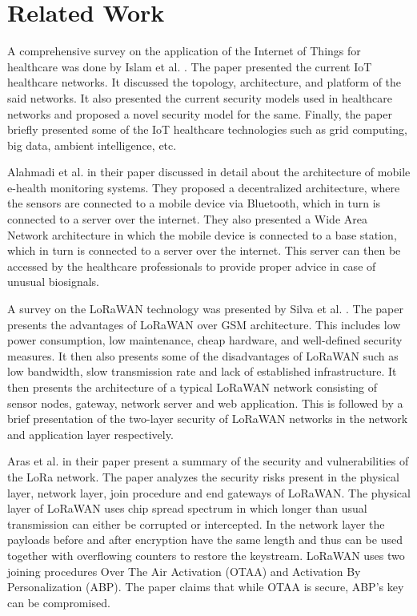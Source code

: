 \chapter{Related Work}
\label{cha:related-work}


A comprehensive survey on the application of the Internet of Things for healthcare was done by Islam et al. \cite{islam2015internet}. The paper presented the current IoT healthcare networks. It discussed the topology, architecture, and platform of the said networks. It also presented the current security models used in healthcare networks and proposed a novel security model for the same. Finally, the paper briefly presented some of the IoT healthcare technologies such as grid computing, big data, ambient intelligence, etc.

Alahmadi et al. \cite{alahmadi2011smart} in their paper discussed in detail about the architecture of mobile e-health monitoring systems. They proposed a decentralized architecture, where the sensors are connected to a mobile device via Bluetooth, which in turn is connected to a server over the internet. They also presented a Wide Area Network architecture in which the mobile device is connected to a base station, which in turn is connected to a server over the internet. This server can then be accessed by the healthcare professionals to provide proper advice in case of unusual biosignals.

A survey on the LoRaWAN technology was presented by Silva et al. \cite{de2017lorawan}. The paper presents the advantages of LoRaWAN over GSM architecture. This includes low power consumption, low maintenance, cheap hardware, and well-defined security measures. It then also presents some of the disadvantages of LoRaWAN such as low bandwidth, slow transmission rate and lack of established infrastructure. It then presents the architecture of a typical LoRaWAN network consisting of sensor nodes, gateway, network server and web application. 
This is followed by a brief presentation of the two-layer security of LoRaWAN networks in the network and application layer respectively.

Aras et al. \cite{aras2017exploring} in their paper present a summary of the security and vulnerabilities of the LoRa network. The paper analyzes the security risks present in the physical layer, network layer, join procedure and end gateways of LoRaWAN. The physical layer of LoRaWAN uses chip spread spectrum in which longer than usual transmission can either be corrupted or intercepted. In the network layer the payloads before and after encryption have the same length and thus can be used together with overflowing counters to restore the keystream. LoRaWAN uses two joining procedures Over The Air Activation (OTAA) and Activation By Personalization (ABP). The paper claims that while OTAA is secure, ABP's key can be compromised.

